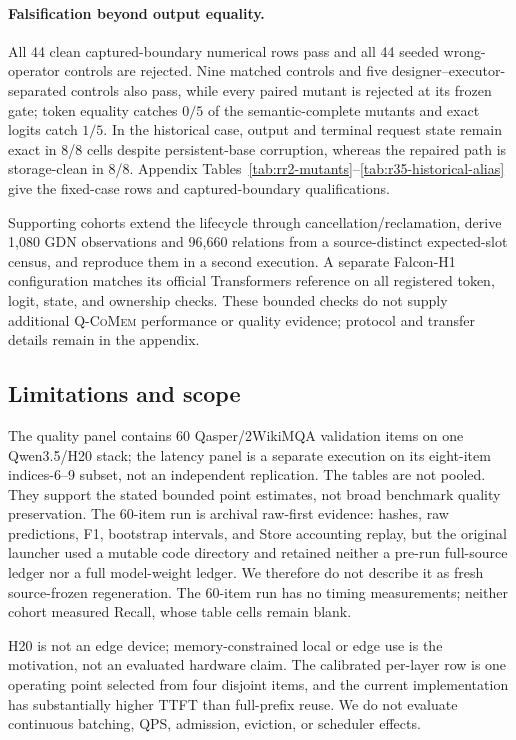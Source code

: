 \documentclass{article}
\newcommand{\qcomem}{\textsc{Q-CoMem}}
\begin{document}
\paragraph{Falsification beyond output equality.}
All 44 clean captured-boundary numerical rows pass and all 44 seeded
wrong-operator controls are rejected.  Nine matched controls and five
designer--executor-separated controls also pass, while every paired mutant is
rejected at its frozen gate; token equality catches $0/5$ of the semantic-complete
mutants and exact logits catch $1/5$.  In the historical case, output and
terminal request state remain exact in 8/8 cells despite persistent-base
corruption, whereas the repaired path is storage-clean in 8/8.  Appendix
Tables~\ref{tab:rr2-mutants}--\ref{tab:r35-historical-alias} give the fixed-case
rows and captured-boundary qualifications.

Supporting cohorts extend the lifecycle through cancellation/reclamation,
derive 1,080 GDN observations and 96,660 relations from a source-distinct
expected-slot census, and reproduce them in a second execution.  A separate
Falcon-H1 configuration matches its official Transformers reference on all
registered token, logit, state, and ownership checks.  These bounded checks do
not supply additional \qcomem{} performance or quality evidence; protocol and
transfer details remain in the appendix.

\subsection{Limitations and scope}
\label{sec:limitations}

The quality panel contains 60 Qasper/2WikiMQA validation items on one
Qwen3.5/H20 stack; the latency panel is a separate execution on its eight-item
indices-6--9 subset, not an independent replication.  The tables are not
pooled.  They support the stated bounded point estimates, not broad benchmark
quality preservation.  The
60-item run is archival raw-first evidence: hashes, raw predictions, F1,
bootstrap intervals, and Store accounting replay, but the original launcher
used a mutable code directory and retained neither a pre-run full-source ledger
nor a full model-weight ledger.  We therefore do not describe it as fresh
source-frozen regeneration.  The 60-item run has no timing measurements; neither
cohort measured Recall, whose table cells remain blank.

H20 is not an edge device; memory-constrained local or edge use is the
motivation, not an evaluated hardware claim.  The calibrated per-layer row is
one operating point selected from four disjoint items, and the current
implementation has substantially higher TTFT than full-prefix reuse.  We do
not evaluate continuous batching, QPS, admission, eviction, or scheduler
effects.
\end{document}
